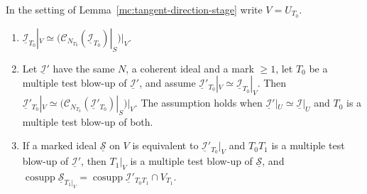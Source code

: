 \begin{theorem}
\label{mc:contact-equivalence-stage}
\leanok
In the setting of Lemma~\ref{mc:tangent-direction-stage} write \(V=U_{T_0}\).
\begin{enumerate}
\item \(\underline{\mathcal I}_{T_0}|_V\simeq(\mathcal C_{N_{T_0}}(\underline{\mathcal I}_{T_0})|_S)|_V\).
\item Let \(\underline{\mathcal I}'\) have the same \(N\), a coherent ideal and a mark \(\ge1\), let \(T_0\) be a multiple test blow-up of \(\underline{\mathcal I}'\), and assume
\(\underline{\mathcal I}'_{T_0}|_V\simeq\underline{\mathcal I}_{T_0}|_V\). Then \(\underline{\mathcal I}'_{T_0}|_V\simeq(\mathcal C_{N_{T_0}}(\underline{\mathcal I}'_{T_0})|_S)|_V\). The assumption
holds when \(\underline{\mathcal I}'|_U\simeq\underline{\mathcal I}|_U\) and \(T_0\) is a multiple test blow-up of both.
\item If a marked ideal \(\underline{\mathcal S}\) on \(V\) is equivalent to \(\underline{\mathcal I}'_{T_0}|_V\) and \(T_0T_1\) is a multiple test blow-up of \(\underline{\mathcal I}'\), then
\(T_1|_V\) is a multiple test blow-up of \(\underline{\mathcal S}\), and \(\operatorname{cosupp}\underline{\mathcal S}_{T_1|_V}=\operatorname{cosupp}\underline{\mathcal I}'_{T_0T_1}\cap V_{T_1}\).
\end{enumerate}
\end{theorem}

